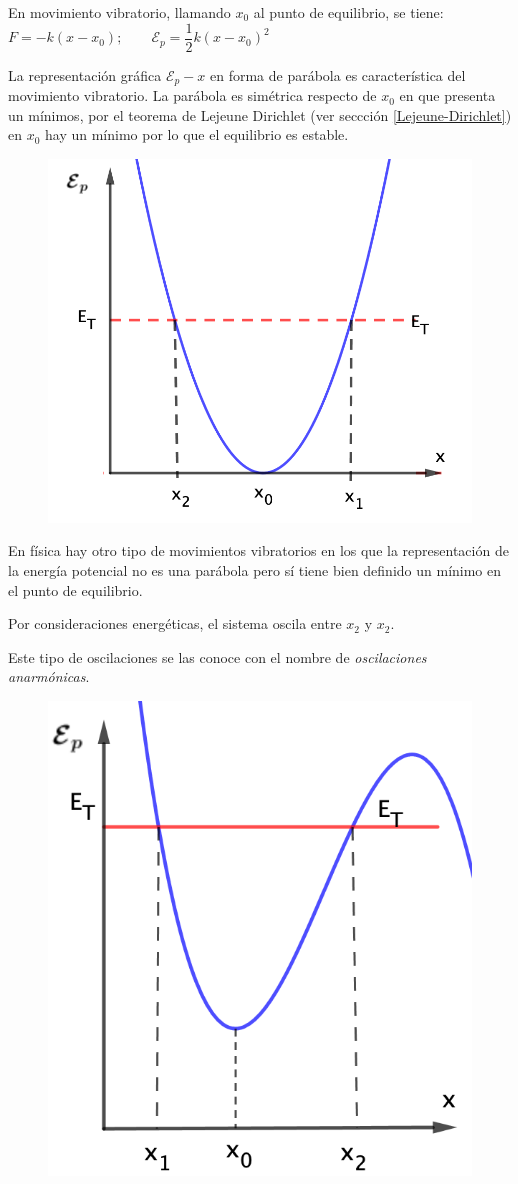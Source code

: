 En movimiento vibratorio, llamando $x_0$ al punto de equilibrio, se tiene:
$F=-k(x-x_0); \qquad \mathcal E_p=\dfrac 1 2 k (x-x_0)^2$

\begin{multicols}{2}
La representación gráfica $\mathcal E_p - x$ en forma de parábola es característica del movimiento vibratorio. La parábola es simétrica respecto de $x_0$ en que presenta un mínimos, por el teorema de Lejeune Dirichlet (ver seccción \ref{Lejeune-Dirichlet}) en $x_0$ hay un mínimo por lo que el equilibrio es estable.

\begin{figure}[H]
		\centering
		\includegraphics[width=.45\textwidth]{imagenes/imagenes20/T20IM01.png}
	\end{figure}
\end{multicols}

\begin{multicols}{2}
En física hay otro tipo de movimientos vibratorios en los que la representación de la energía potencial no es una parábola pero sí tiene bien definido un mínimo en el punto de equilibrio.

Por consideraciones energéticas, el sistema oscila entre $x_2$ y $x_2$.

Este tipo de oscilaciones se las conoce con el nombre de \emph{oscilaciones anarmónicas}.
\begin{figure}[H]
		\centering
		\includegraphics[width=.4\textwidth]{imagenes/imagenes20/T20IM02.png}
	\end{figure}
\end{multicols}

